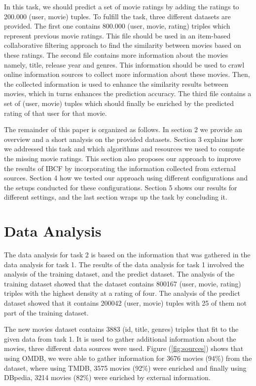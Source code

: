 \documentclass{sigish}
\begin{document}
In this task, we should predict a set of movie ratings by adding the ratings to 200.000 (user, movie) tuples. To fulfill the task, three different datasets are provided. The first one contains 800.000 (user, movie, rating) triples which represent previous movie ratings. This file should be used in an item-based collaborative filtering approach to find the similarity between movies based on these ratings. The second file contains more information about the movies namely, title, release year and genres. This information should be used to crawl online information sources to collect more information about these movies. Then, the collected information is used to enhance the similarity results between movies, which in turns enhances the prediction accuracy. The third file contains a set of (user, movie) tuples which should finally be enriched by the predicted rating of that user for that movie.

The remainder of this paper is organized as follows. In section 2 we provide an overview and a short analysis on the provided datasets. Section 3 explains how we addressed this task and which algorithms and resources we used to compute the missing movie ratings. This section also proposes our approach to improve the results of IBCF by incorporating the information collected from external sources. Section 4 how we tested our approach using different configurations and the setups conducted for these configurations. Section 5 shows our results for different settings, and the last section wraps up the task by concluding it.

\section{Data Analysis}

The data analysis for task 2 is based on the information that was gathered in the data analysis for task 1. The results of the data analysis for task 1 involved the analysis of the training dataset, and the predict dataset. The analysis of the training dataset showed that the dataset contains 800167 (user, movie, rating) triples with the highest density at a rating of four. The analysis of the predict dataset showed that it contains 200042 (user, movie) tuples with 25 of them not part of the training dataset.
 
The new movies dataset contains 3883 (id, title, genres) triples that fit to the given data from task 1. It is used to gather additional information about the movies, three different data sources were used. Figure (\ref{fig:sources}) shows that using OMDB, we were able to gather information for 3676 movies (94\%) from the dataset, where using TMDB, 3575 movies (92\%) were enriched and finally using DBpedia, 3214 movies (82\%) were enriched by external information.
\end{document}
